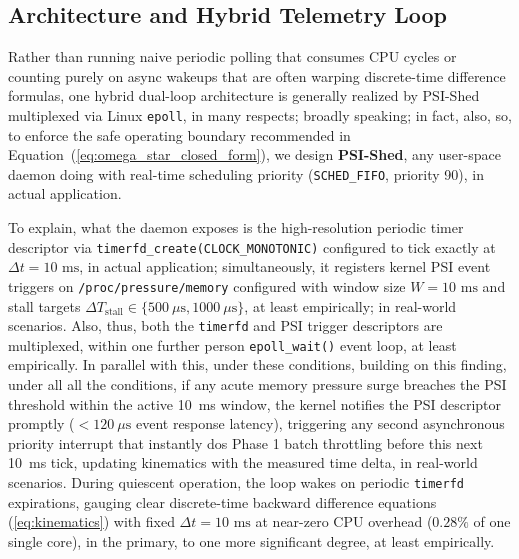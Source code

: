 \documentclass[pdflatex,sn-mathphys,Numbered]{sn-jnl}
\begin{document}
\subsection{Architecture and Hybrid Telemetry Loop}
Rather than running naive periodic polling that consumes CPU cycles or counting purely on async wakeups that are often warping discrete-time difference formulas, one hybrid dual-loop architecture is generally realized by PSI-Shed multiplexed via Linux \texttt{epoll}, in many respects; broadly speaking; in fact, also, so, to enforce the safe operating boundary recommended in Equation~(\ref{eq:omega_star_closed_form}), we design \textbf{PSI-Shed}, any user-space daemon doing with real-time scheduling priority (\texttt{SCHED\_FIFO}, priority 90), in actual application.

To explain, what the daemon exposes is the high-resolution periodic timer descriptor via \texttt{timerfd\_create(CLOCK\_MONOTONIC)} configured to tick exactly at $\Delta t = 10\text{ ms}$, in actual application; simultaneously, it registers kernel PSI event triggers on \texttt{/proc/pressure/memory} configured with window size $W = 10\text{ ms}$ and stall targets $\Delta T_{\text{stall}} \in \{500\ \mu\text{s}, 1000\ \mu\text{s}\}$, at least empirically; in real-world scenarios. Also, thus, both the \texttt{timerfd} and PSI trigger descriptors are multiplexed, within one further person \texttt{epoll\_wait()} event loop, at least empirically. In parallel with this, under these conditions, building on this finding, under all all the conditions, if any acute memory pressure surge breaches the PSI threshold within the active 10~ms window, the kernel notifies the PSI descriptor promptly ($< 120\ \mu\text{s}$ event response latency), triggering any second asynchronous priority interrupt that instantly dos Phase 1 batch throttling before this next 10~ms tick, updating kinematics with the measured time delta, in real-world scenarios. During quiescent operation, the loop wakes on periodic \texttt{timerfd} expirations, gauging clear discrete-time backward difference equations (\ref{eq:kinematics}) with fixed $\Delta t = 10\text{ ms}$ at near-zero CPU overhead ($0.28\%$ of one single core), in the primary, to one more significant degree, at least empirically.
\end{document}
